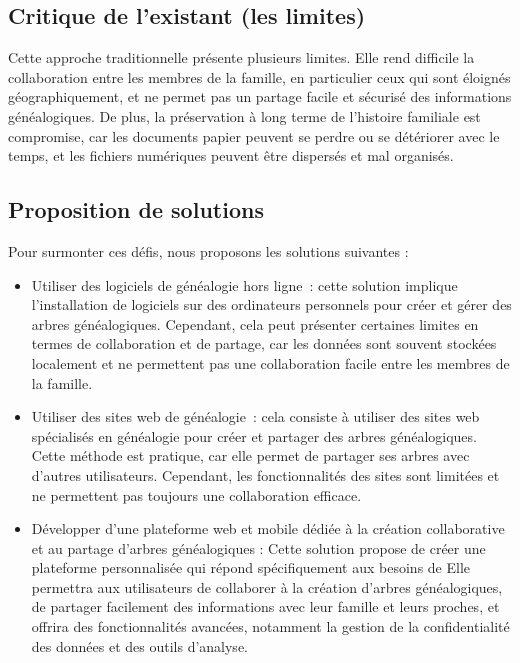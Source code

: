\subsection{Critique de l'existant (les limites)}
Cette approche traditionnelle présente plusieurs limites. Elle rend difficile
la collaboration entre les membres de la famille, en particulier ceux qui sont
éloignés géographiquement, et ne permet pas un partage facile et sécurisé des
informations généalogiques. De plus, la préservation à long terme de l’histoire
familiale est compromise, car les documents papier peuvent se perdre ou se
détériorer avec le temps, et les fichiers numériques peuvent être dispersés et mal organisés.

\subsection{Proposition de solutions}
Pour surmonter ces défis, nous proposons les solutions suivantes :
\begin{itemize}
  \item  Utiliser des logiciels de généalogie hors ligne : cette solution implique
    l’installation de logiciels sur des ordinateurs personnels pour créer et gérer
    des arbres généalogiques. Cependant, cela peut présenter certaines limites
    en termes de collaboration et de partage, car les données sont souvent stockées
    localement et ne permettent pas une collaboration facile entre les membres de la famille.

  \item  Utiliser des sites web de généalogie : cela consiste à
    utiliser des sites web spécialisés en généalogie pour créer et partager des arbres
    généalogiques. Cette méthode est pratique, car elle permet de partager ses arbres
    avec d’autres utilisateurs. Cependant, les fonctionnalités des sites sont limitées et ne
    permettent pas toujours une collaboration efficace.

  \item Développer d’une plateforme web et mobile dédiée à la création
    collaborative et au partage d’arbres généalogiques : Cette solution propose
    de créer une plateforme personnalisée qui répond spécifiquement aux besoins de
    \firm Elle permettra aux utilisateurs de collaborer à la création d’arbres
    généalogiques, de partager facilement des informations avec leur famille et
    leurs proches, et offrira des fonctionnalités avancées, notamment la gestion
    de la confidentialité des données et des outils d’analyse.

\end{itemize}

